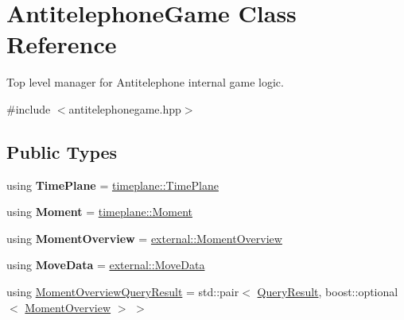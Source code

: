 \hypertarget{class_antitelephone_game}{}\section{Antitelephone\+Game Class Reference}
\label{class_antitelephone_game}


Top level manager for Antitelephone internal game logic.  




{\ttfamily \#include $<$antitelephonegame.\+hpp$>$}

\subsection*{Public Types}
\begin{DoxyCompactItemize}
\item 
\mbox{\label{class_antitelephone_game_a6f5bff3c072b992022d47276f2684848}} 
using {\bfseries Time\+Plane} = \hyperlink{classtimeplane_1_1_time_plane}{timeplane\+::\+Time\+Plane}
\item 
\mbox{\label{class_antitelephone_game_a8f68b4de9218b82ecfc9ebd24fc57813}} 
using {\bfseries Moment} = \hyperlink{classtimeplane_1_1_moment}{timeplane\+::\+Moment}
\item 
\mbox{\label{class_antitelephone_game_abada6d8d7931cf15fd1eb4b6290d7c15}} 
using {\bfseries Moment\+Overview} = \hyperlink{classexternal_1_1_moment_overview}{external\+::\+Moment\+Overview}
\item 
\mbox{\label{class_antitelephone_game_a8c579f8757044c9515a61a997af44701}} 
using {\bfseries Move\+Data} = \hyperlink{classexternal_1_1_move_data}{external\+::\+Move\+Data}
\item 
using \hyperlink{class_antitelephone_game_a99ab937cb4918da1c80bd8d07e43f920}{Moment\+Overview\+Query\+Result} = std\+::pair$<$ \hyperlink{class_query_result}{Query\+Result}, boost\+::optional$<$ \hyperlink{classexternal_1_1_moment_overview}{Moment\+Overview} $>$ $>$
\end{DoxyCompactItemize}

